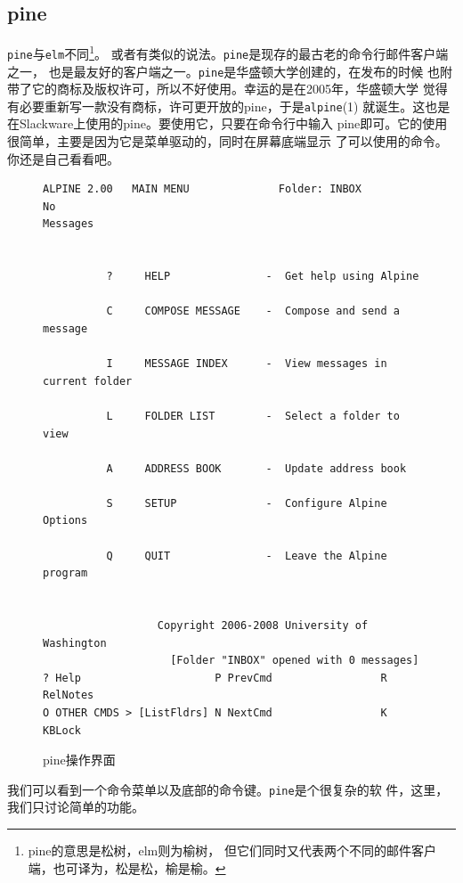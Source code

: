 \subsection{pine}
\label{chap:basicNetworkCommands:email:pine}
\texttt{pine}与\texttt{elm}不同\footnote{pine的意思是松树，elm则为榆树，
  但它们同时又代表两个不同的邮件客户端，也可译为，松是松，榆是榆。}。
或者有类似的说法。\texttt{pine}是现存的最古老的命令行邮件客户端之一，
也是最友好的客户端之一。\texttt{pine}是华盛顿大学创建的，在发布的时候
也附带了它的商标及版权许可，所以不好使用。幸运的是在2005年，华盛顿大学
觉得有必要重新写一款没有商标，许可更开放的pine，于是\texttt{alpine}(1)
就诞生。这也是在Slackware上使用的pine。要使用它，只要在命令行中输入
pine即可。它的使用很简单，主要是因为它是菜单驱动的，同时在屏幕底端显示
了可以使用的命令。你还是自己看看吧。
\begin{figure}[htpb]
  \centering
  
\begin{Verbatim}[frame=single, commandchars=\\\{\}]
  ALPINE 2.00   MAIN MENU              Folder: INBOX               No
Messages  


          ?     HELP               -  Get help using Alpine           

          C     COMPOSE MESSAGE    -  Compose and send a message      

          I     MESSAGE INDEX      -  View messages in current folder 

          L     FOLDER LIST        -  Select a folder to view         

          A     ADDRESS BOOK       -  Update address book             

          S     SETUP              -  Configure Alpine Options        

          Q     QUIT               -  Leave the Alpine program        


                  Copyright 2006-2008 University of Washington
                    [Folder "INBOX" opened with 0 messages]
? Help                     P PrevCmd                 R RelNotes                 
O OTHER CMDS > [ListFldrs] N NextCmd                 K KBLock    
\end{Verbatim}

  \caption{pine操作界面}
  \label{fig:pine}
\end{figure}

我们可以看到一个命令菜单以及底部的命令键。\texttt{pine}是个很复杂的软
件，这里，我们只讨论简单的功能。

